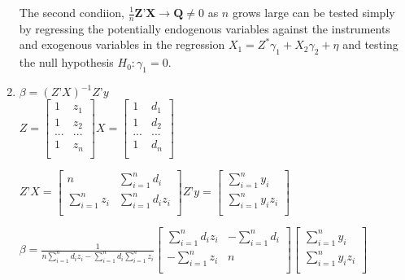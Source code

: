 \documentclass{article}
\begin{document}
\begin{enumerate}[label=(\alph*)]
	The second condiion, $\frac{1}{n}\mathbf{Z}’\mathbf{X} \rightarrow \mathbf{Q} \neq 0$ as $n$ grows large can be tested simply by regressing the potentially endogenous variables against the instruments and exogenous variables in the regression $X_{1} = Z^{*}\gamma_{1} + X_{2}\gamma_{2} + \eta$ and testing the null hypothesis $H_{0}: \gamma_{1} = 0$.
	
	\item
	$\beta=(Z’X)^{-1}Z’y$ \\ [4pt]
	$Z = 
	\begin{bmatrix}
	1 & z_{1} \\
	1 & z_{2} \\
	... & ... \\
	1 & z_{n} \\
	\end{bmatrix}
	X = 
	\begin{bmatrix}
	1 & d_{1} \\
	1 & d_{2} \\
	... & ... \\
	1 & d_{n} \\
	\end{bmatrix}$
	
	$Z’X = 
	\begin{bmatrix}
	n & \sum_{i=1}^{n} d_{i} \\
	\sum_{i=1}^{n} z_{i} & \sum_{i=1}^{n} d_{i}z_{i} \\
	\end{bmatrix}
	Z’y = 
	\begin{bmatrix}
	\sum_{i=1}^{n} y_{i} \\
	\sum_{i=1}^{n} y_{i} z_{i} \\
	\end{bmatrix}$

	$\beta= \frac{1}{n \sum_{i=1}^{n} d_{i}z_{i} - \sum_{i=1}^{n} d_{i}\sum_{i=1}^{n} z_{i}}
	\begin{bmatrix}
	\sum_{i=1}^{n} d_{i}z_{i} & -\sum_{i=1}^{n} d_{i} \\
	-\sum_{i=1}^{n} z_{i} & n \\
	\end{bmatrix}
	\begin{bmatrix}
	\sum_{i=1}^{n} y_{i} \\
	\sum_{i=1}^{n} y_{i} z_{i} \\
	\end{bmatrix}
	$
	

\end{enumerate}
\end{document}
